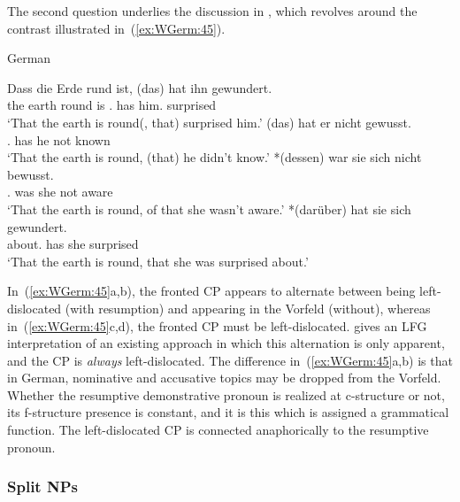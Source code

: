 \documentclass[output=paper,hidelinks]{langscibook}
\begin{document}
The second question underlies the discussion in
\citet[§7.4]{Berman2003}, which revolves around the
contrast illustrated in~(\ref{ex:WGerm:45}).

\begin{exe}
  \ex\label{ex:WGerm:45} German \citep[§7.4, examples 58--61]{Berman2003}
  \begin{xlist}
    \ex \gll Dass die Erde rund ist, (das) hat ihn gewundert.\\
             \COMP{} the earth round is \phantom{(}\DEM.\NOM{} has him.\ACC{} surprised\\
        \glt `That the earth is round(, that) surprised him.'
    \ex {} (das) hat er nicht gewusst.\\
     {} \phantom{(}\DEM.\ACC{} has he not known\\
    \glt `That the earth is round, (that) he didn't know.'
    \ex {} *(dessen) war sie sich nicht bewusst.\\
    {} \phantom{*(}\DEM.\GEN{} was she \REFL{} not aware\\
    \glt `That the earth is round, of that she wasn't aware.'
    \ex {} *(darüber) hat sie sich gewundert.\\
    {} \phantom{*(}about.\DEM{} has she \REFL{} surprised\\
    \glt `That the earth is round, that she was surprised about.'
  \end{xlist}
\end{exe}

In~(\ref{ex:WGerm:45}a,b), the fronted CP appears to alternate between being
left-dislocated (with resumption) and appearing in the Vorfeld
(without), whereas in~(\ref{ex:WGerm:45}c,d), the fronted CP must be
left-dislocated. \citeauthor{Berman2003} gives an LFG
interpretation of an existing approach in which this alternation is
only apparent, and the CP is \textit{always} left-dislocated. The
difference in~(\ref{ex:WGerm:45}a,b) is that in German, nominative and accusative
topics may be dropped from the Vorfeld. Whether the resumptive
demonstrative pronoun is realized at c-structure or not, its
f-structure presence is constant, and it is this which is assigned a
grammatical function. The left-dislocated CP is connected
anaphorically to the resumptive pronoun.


\subsubsection{Split NPs\label{sec:Germanic:splitnps}}
\end{document}
